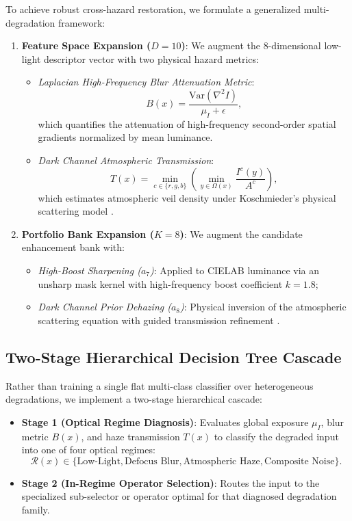 \documentclass[journal]{IEEEtran}
\begin{document}
To achieve robust cross-hazard restoration, we formulate a generalized multi-degradation framework:
\begin{enumerate}
    \item \textbf{Feature Space Expansion ($D=10$)}: We augment the 8-dimensional low-light descriptor vector with two physical hazard metrics:
    \begin{itemize}
        \item \textit{Laplacian High-Frequency Blur Attenuation Metric}:
        \begin{equation}
        B(x) = \frac{\text{Var}(\nabla^2 I)}{\mu_I + \epsilon},
        \end{equation}
        which quantifies the attenuation of high-frequency second-order spatial gradients normalized by mean luminance.
        \item \textit{Dark Channel Atmospheric Transmission}:
        \begin{equation}
        T(x) = \min_{c \in \{r, g, b\}} \left( \min_{y \in \Omega(x)} \frac{I^c(y)}{A^c} \right),
        \end{equation}
        which estimates atmospheric veil density under Koschmieder's physical scattering model \cite{koschmieder1924theorie, he2011single}.
    \end{itemize}
    \item \textbf{Portfolio Bank Expansion ($K=8$)}: We augment the candidate enhancement bank with:
    \begin{itemize}
        \item \textit{High-Boost Sharpening ($a_7$)}: Applied to CIELAB luminance via an unsharp mask kernel with high-frequency boost coefficient $k=1.8$;
        \item \textit{Dark Channel Prior Dehazing ($a_8$)}: Physical inversion of the atmospheric scattering equation with guided transmission refinement \cite{he2011single}.
    \end{itemize}
\end{enumerate}

\subsection{Two-Stage Hierarchical Decision Tree Cascade}
Rather than training a single flat multi-class classifier over heterogeneous degradations, we implement a two-stage hierarchical cascade:
\begin{itemize}
    \item \textbf{Stage 1 (Optical Regime Diagnosis)}: Evaluates global exposure $\mu_I$, blur metric $B(x)$, and haze transmission $T(x)$ to classify the degraded input into one of four optical regimes:
    \begin{equation}
    \mathcal{R}(x) \in \{\text{Low-Light}, \text{Defocus Blur}, \text{Atmospheric Haze}, \text{Composite Noise}\}.
    \end{equation}
    \item \textbf{Stage 2 (In-Regime Operator Selection)}: Routes the input to the specialized sub-selector or operator optimal for that diagnosed degradation family.
\end{itemize}
\end{document}

